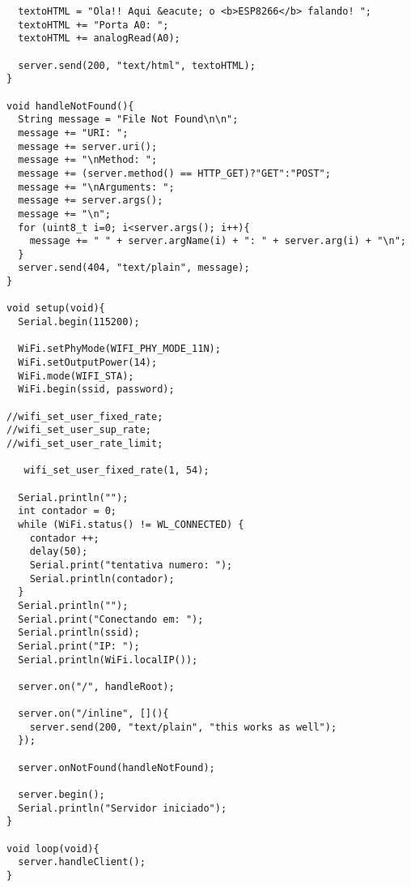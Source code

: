 \begin{lstlisting}
  textoHTML = "Ola!! Aqui &eacute; o <b>ESP8266</b> falando! ";
  textoHTML += "Porta A0: ";
  textoHTML += analogRead(A0);
   
  server.send(200, "text/html", textoHTML);
}

void handleNotFound(){
  String message = "File Not Found\n\n";
  message += "URI: ";
  message += server.uri();
  message += "\nMethod: ";
  message += (server.method() == HTTP_GET)?"GET":"POST";
  message += "\nArguments: ";
  message += server.args();
  message += "\n";
  for (uint8_t i=0; i<server.args(); i++){
    message += " " + server.argName(i) + ": " + server.arg(i) + "\n";
  }
  server.send(404, "text/plain", message);
}

void setup(void){
  Serial.begin(115200);
  
  WiFi.setPhyMode(WIFI_PHY_MODE_11N);
  WiFi.setOutputPower(14);
  WiFi.mode(WIFI_STA);
  WiFi.begin(ssid, password);

//wifi_set_user_fixed_rate;
//wifi_set_user_sup_rate;
//wifi_set_user_rate_limit;

   wifi_set_user_fixed_rate(1, 54);

  Serial.println("");
  int contador = 0;
  while (WiFi.status() != WL_CONNECTED) {
    contador ++;
    delay(50);
    Serial.print("tentativa numero: ");
    Serial.println(contador);
  }
  Serial.println("");
  Serial.print("Conectando em: ");
  Serial.println(ssid);
  Serial.print("IP: ");
  Serial.println(WiFi.localIP());

  server.on("/", handleRoot);

  server.on("/inline", [](){
    server.send(200, "text/plain", "this works as well");
  });

  server.onNotFound(handleNotFound);

  server.begin();
  Serial.println("Servidor iniciado");
}

void loop(void){
  server.handleClient();
}


\end{lstlisting}